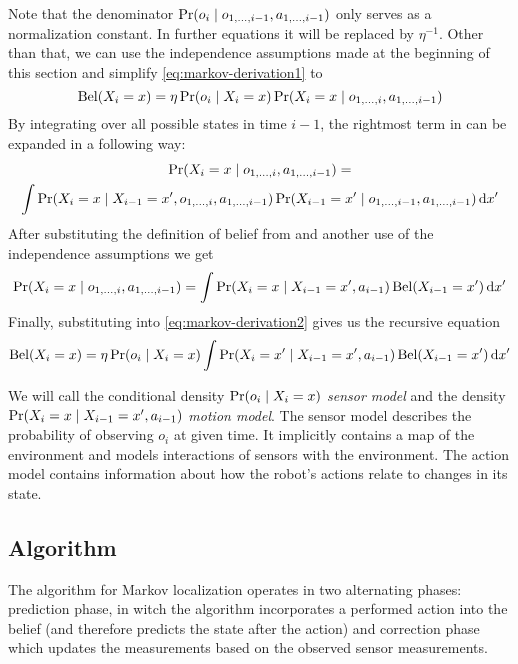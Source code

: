 Note that the denominator \(\operatorname{\mathrm{Pr}}(o_i \mid o_{1, \dotsc, i-1}, a_{1, \dotsc, i-1})\) only
serves as a normalization constant.
In further equations it will be replaced by \(\eta^{-1}\).
Other than that, we can use the independence assumptions made at the beginning
of this section and simplify \eqref{eq:markov-derivation1} to
\begin{equation}
	\label{eq:markov-derivation2}
	\operatorname{\mathrm{Bel}}(X_i = x) =
		\eta \operatorname{\mathrm{Pr}}(o_i \mid X_i = x)
		\operatorname{\mathrm{Pr}}(X_i = x \mid o_{1, \dotsc, i}, a_{1, \dotsc, i - 1})
\end{equation}
By integrating over all possible states in time \(i - 1\), the rightmost term in
 can be expanded in a following way:
\begin{multline}
	\label{eq:markov-derivation3}
	\operatorname{\mathrm{Pr}}(X_i = x \mid o_{1, \dotsc, i}, a_{1, \dotsc, i - 1}) = \\
	\int
	\operatorname{\mathrm{Pr}}(X_i = x \mid X_{i - 1}=x', o_{1, \dotsc, i}, a_{1, \dotsc, i - 1})
	\operatorname{\mathrm{Pr}}(X_{i-1} = x' \mid o_{1, \dotsc, i-1}, a_{1, \dotsc, i-1})
	\,\mathrm{d}x'
\end{multline}
After substituting the definition of belief from 
and another use of the independence assumptions we get
\begin{equation}
	\label{eq:markov-derivation4}
	\operatorname{\mathrm{Pr}}(X_i = x \mid o_{1, \dotsc, i}, a_{1, \dotsc, i - 1}) =
	\int
	\operatorname{\mathrm{Pr}}(X_i = x \mid X_{i - 1}=x', a_{i - 1})
	\operatorname{\mathrm{Bel}}(X_{i-1} = x')
	\,\mathrm{d}x'
\end{equation}
Finally, substituting into \eqref{eq:markov-derivation2} gives us the recursive
equation
\begin{equation}
	\label{eq:markov-final}
	\operatorname{\mathrm{Bel}}(X_i = x) =
	\eta \operatorname{\mathrm{Pr}}(o_i \mid X_i = x)
		\int
		\operatorname{\mathrm{Pr}}(X_i = x' \mid X_{i - 1}=x', a_{i - 1})
		\operatorname{\mathrm{Bel}}(X_{i-1} = x')
		\,\mathrm{d}x'
\end{equation}

We will call the conditional density \(\operatorname{\mathrm{Pr}}(o_i \mid X_i = x)\) \emph{sensor model} and
the density \(\operatorname{\mathrm{Pr}}(X_i = x \mid X_{i - 1}=x', a_{i - 1})\) \emph{motion model}.
The sensor model describes the probability of observing \(o_i\) at given time.
It implicitly contains a map of the environment and models interactions of sensors with
the environment.
The action model contains information about how the robot's actions relate to changes in its state.

\subsection{Algorithm}
The algorithm for Markov localization operates in two alternating phases:
prediction phase, in witch the algorithm incorporates a performed action into the belief
(and therefore predicts the state after the action) and correction phase which updates
the measurements based on the observed sensor measurements.

